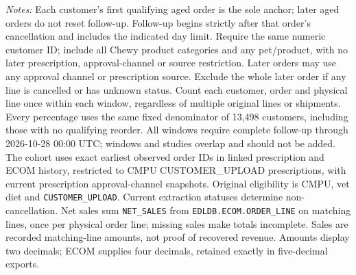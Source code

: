 \begin{table}[!htbp]
\begin{minipage}{\linewidth}
\footnotesize
\textit{Notes:} Each customer's first qualifying aged order is the sole anchor;
later aged orders do not reset follow-up. Follow-up begins strictly after that
order's cancellation and includes the indicated day limit. Require the same numeric customer ID; include all Chewy product categories and any pet/product, with no later prescription, approval-channel or source restriction. Later orders may use any approval channel or prescription
source. Exclude the whole later order if any line is cancelled or has unknown
status. Count each customer, order and physical line once within each window,
regardless of multiple original lines or shipments. Every percentage uses the
same fixed denominator of 13,498 customers, including those with no
qualifying reorder. All windows require complete follow-up through
2026-10-28 00:00 UTC; windows and studies overlap and should not be added.
The cohort uses exact earliest observed order IDs in linked prescription and
ECOM history, restricted to CMPU CUSTOMER\_UPLOAD prescriptions, with current
prescription approval-channel snapshots. Original eligibility is CMPU,
vet diet and \texttt{CUSTOMER\_UPLOAD}. Current extraction statuses determine
non-cancellation. Net sales sum \texttt{NET\_SALES} from \texttt{EDLDB.ECOM.ORDER\_LINE} on matching
lines, once per physical order line; missing sales make totals incomplete.
Sales are recorded matching-line amounts, not proof of recovered revenue.
Amounts display two decimals; ECOM supplies four decimals, retained exactly in five-decimal exports.
\end{minipage}
\end{table}
